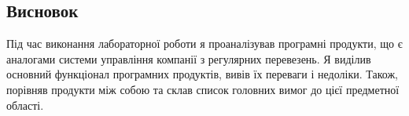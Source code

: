 \documentclass[14pt]{extreport}
\begin{document}
\begin{normalsize}
	\section*{Висновок}
	Під час виконання лабораторної роботи я проаналізував програмні продукти, що є аналогами системи управління компанії з регулярних перевезень. Я виділив основний функціонал програмних продуктів, вивів їх переваги і недоліки. Також, порівняв продукти між собою та склав список головних вимог до цієї предметної області.
	 
\end{normalsize}
\end{document}
